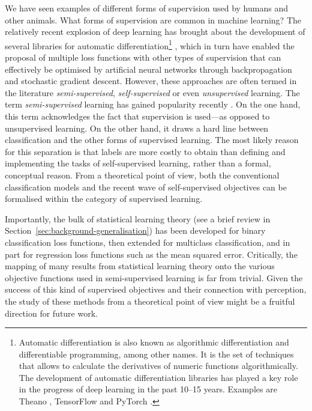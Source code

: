 {We have seen examples of different forms of supervision used by humans and other animals. What forms of supervision are common in machine learning? The relatively recent explosion of deep learning has brought about the development of several libraries for automatic differentiation\footnote{Automatic differentiation is also known as algorithmic differentiation and differentiable programming, among other names. It is the set of techniques that allows to calculate the derivatives of numeric functions algorithmically. The development of automatic differentiation libraries has played a key role in the progress of deep learning in the past 10--15 years. Examples are Theano \citep{theano2016}, TensorFlow \citep{tensorflow2015} and PyTorch \citep{pytorch2019}.} \citep{baydin2017automaticdifferentiation}, which in turn have enabled the proposal of multiple loss functions with other types of supervision that can effectively be optimised by artificial neural networks through backpropagation and stochastic gradient descent. However, these approaches are often termed in the literature \textit{semi-supervised}, \textit{self-supervised} or even \textit{unsupervised} learning. The term \textit{semi-supervised} learning has gained popularity recently \citep{jing2020selfsupervised}. On the one hand, this term acknowledges the fact that supervision is used---as opposed to unsupervised learning. On the other hand, it draws a hard line between classification and the other forms of supervised learning. The most likely reason for this separation is that labels are more costly to obtain than defining and implementing the tasks of self-supervised learning, rather than a formal, conceptual reason. From a theoretical point of view, both the conventional classification models and the recent wave of self-supervised objectives can be formalised within the category of supervised learning.

Importantly, the bulk of statistical learning theory (see a brief review in Section~\ref{sec:background-generalisation}) has been developed for binary classification loss functions, then extended for multiclass classification, and in part for regression loss functions such as the mean squared error. Critically, the mapping of many results from statistical learning theory onto the various objective functions used in semi-supervised learning is far from trivial. Given the success of this kind of supervised objectives and their connection with perception, the study of these methods from a theoretical point of view might be a fruitful direction for future work.

}

